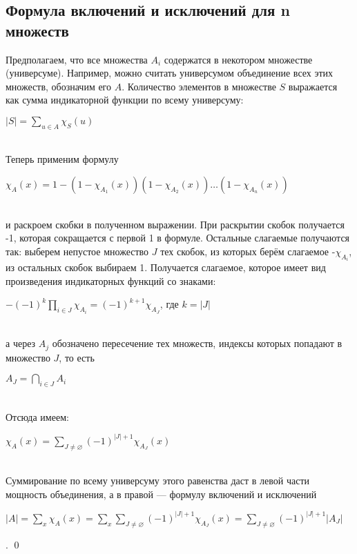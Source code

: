\documentclass[a4paper]{article}
\begin{document}
\subsection{Формула включений и исключений для n множеств}
Предполагаем, что все множества $A_i$ содержатся в некотором множестве (универсуме). Например, можно считать универсумом объединение всех этих множеств, обозначим его $A$. Количество элементов в множестве $S$ выражается как сумма индикаторной функции по всему универсуму:\\[2mm]
\centerline{$|S|=\sum\limits_{u \in A} \chi_S(u)$}\\[2mm]
 Теперь применим формулу\\[2mm]
\centerline{$\chi_A(x)=1-\left(1-\chi_{A_1}(x)\right)\left(1-\chi_{A_2}(x)\right) \ldots\left(1-\chi_{A_n}(x)\right)$}\\[2mm]
и раскроем скобки в полученном выражении. При раскрытии скобок получается -1, которая сокращается с первой 1 в формуле. Остальные слагаемые получаются так: выберем непустое множество $J$ тех скобок, из которых берём слагаемое -$\chi_{A_i}$, из остальных скобок выбираем 1. Получается слагаемое, которое имеет вид произведения индикаторных функций со знаками:\\[2mm]
\centerline{$-(-1)^k \prod_{i \in J} \chi_{A_i}=(-1)^{k+1} \chi_{A_J}$, где $k=|J|$}\\[2mm]
а через $A_j$ обозначено пересечение тех множеств, индексы которых попадают в множество $J$, то есть\\[2mm]
\centerline{$A_J=\bigcap\limits_{i \in J} A_i$}\\[2mm]
Отсюда имеем:\\[2mm]
\centerline{$\chi_A(x)=\sum\limits_{J \neq \varnothing}(-1)^{|J|+1} \chi_{A_J}(x)$}\\[2mm]
 Суммирование по всему универсуму этого равенства даст в левой части мощность объединения, а в правой — формулу включений и исключений\\[2mm]
\centerline{$|A|=\sum\limits_{x} \chi_A(x)=\sum\limits_x \sum\limits_{J \neq \varnothing}(-1)^{|J|+1} \chi_{A_J}(x)=\sum\limits_{J \neq \varnothing}(-1)^{|J|+1}\left|A_J\right|$}. \qed
\end{document}
